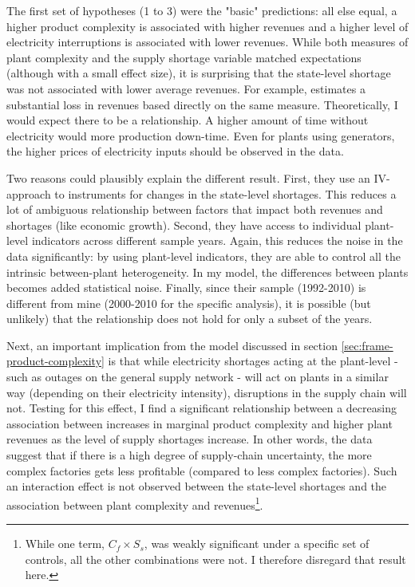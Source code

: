 \documentclass[11pt]{article}
\begin{document}
The first set of hypotheses (1 to 3) were the "basic" predictions: all else equal, a higher product complexity is associated with higher revenues and a higher level of electricity interruptions is associated with lower revenues. While both measures of plant complexity and the supply shortage variable matched expectations (although with a small effect size), it is surprising that the state-level shortage was not associated with lower average revenues. For example, \cite{allcott_how_2016} estimates a substantial loss in revenues based directly on the same measure. Theoretically, I would expect there to be a relationship. A higher amount of time without electricity would more production down-time. Even for plants using generators, the higher prices of electricity inputs should be observed in the data.

Two reasons could plausibly explain the different result. First, they use an IV-approach to instruments for changes in the state-level shortages. This reduces a lot of ambiguous relationship between factors that impact both revenues and shortages (like economic growth). Second, they have access to individual plant-level indicators across different sample years. Again, this reduces the noise in the data significantly: by using plant-level indicators, they are able to control all the intrinsic between-plant heterogeneity. In my model, the differences between plants becomes added statistical noise. Finally, since their sample (1992-2010) is different from mine (2000-2010 for the specific analysis), it is possible (but unlikely) that the relationship does not hold for only a subset of the years.

Next, an important implication from the model discussed in section \ref{sec:frame-product-complexity} is that while electricity shortages acting at the plant-level - such as outages on the general supply network - will act on plants in a similar way (depending on their electricity intensity), disruptions in the supply chain will not. Testing for this effect, I find a significant relationship between a decreasing association between increases in marginal product complexity and higher plant revenues as the level of supply shortages increase. In other words, the data suggest that if there is a high degree of supply-chain uncertainty, the more complex factories gets less profitable (compared to less complex factories). Such an interaction effect is not observed between the state-level shortages and the association between plant complexity and revenues\footnote{While one term, $C_f \times S_{s}$, was weakly significant under a specific set of controls, all the other combinations were not. I therefore disregard that result here.}.
\end{document}
